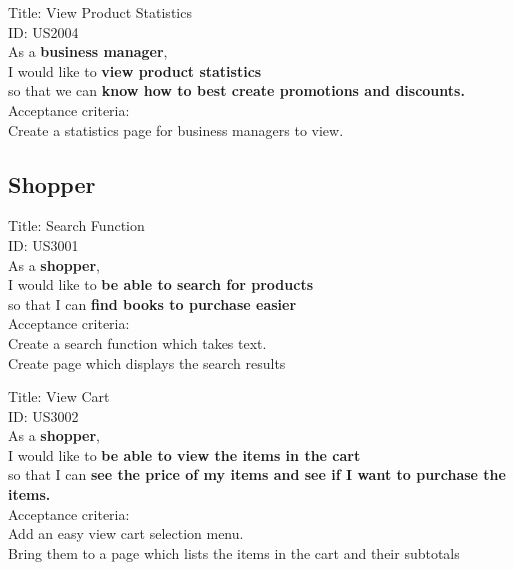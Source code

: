 \documentclass{article}
\begin{document}
\begin{framed}
\noindent
Title: View Product Statistics \\
ID: US2004 \\
As a \textbf{business manager},\\
 \textbullet  \quad \quad I would like to \textbf{view product statistics}\\ 
 \textbullet  \quad \quad so that we can \textbf{know how to best create promotions and discounts. }\\
 Acceptance criteria: \\
  \textbullet  \quad \quad Create a statistics page for business managers to view. \\
\end{framed}


\subsection{Shopper}


\begin{framed}
\noindent
Title: Search Function \\
ID: US3001 \\
As a \textbf{shopper},\\
 \textbullet  \quad \quad I would like to \textbf{be able to search for products}\\ 
 \textbullet  \quad \quad so that I can \textbf{find books to purchase easier}\\
 Acceptance criteria: \\
  \textbullet  \quad \quad Create a search function which takes text. \\
  \textbullet  \quad \quad Create page which displays the search results \\
\end{framed}

\newpage

\begin{framed}
\noindent
Title: View Cart \\
ID: US3002 \\
As a \textbf{shopper},\\
 \textbullet  \quad \quad I would like to \textbf{be able to view the items in the cart}\\ 
 \textbullet  \quad \quad so that I can \textbf{see the price of my items and see if I want to purchase the items.}\\
 Acceptance criteria: \\
  \textbullet  \quad \quad Add an easy view cart selection menu. \\
  \textbullet  \quad \quad Bring them to a page which lists the items in the cart and their subtotals\\
\end{framed}
\end{document}
